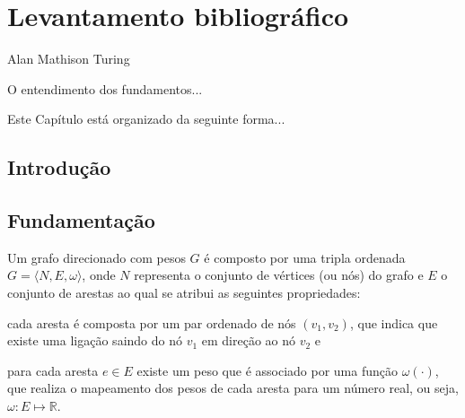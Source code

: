 
\chapter{Levantamento bibliográfico}
\label{cap:2:fundamentacao}

{Alan Mathison Turing}

O entendimento dos fundamentos...

Este Capítulo está organizado da seguinte forma...

\section{Introdução}
\label{sec:2:introducao}

\citep{brassard1996fundamentals}

\section{Fundamentação}
\label{sec:2:fundamentacao}

\begin{definicao}\label{def:grafo}
%
%
\citep{cormen2009algorithms}
Um grafo direcionado com pesos $G$ é composto por uma tripla ordenada
$G=\langle N, E, \omega \rangle$, onde $N$ representa o conjunto de vértices
(ou nós) do grafo e $E$ o conjunto de arestas ao qual se atribui as seguintes
propriedades:
\begin{inparaenum}[(i)]
\item cada aresta é composta por um par ordenado de nós $(v_1,v_2)$, que
    indica que existe uma ligação saindo do nó $v_1$ em direção ao nó $v_2$ e
\item para cada aresta $e \in E$ existe um peso que é associado por uma
    função $\omega(\cdot)$, que realiza o mapeamento dos pesos de cada aresta
    para um número real, ou seja, $\omega \colon E\mapsto\mathbb{R}$.
\end{inparaenum}
\end{definicao}

